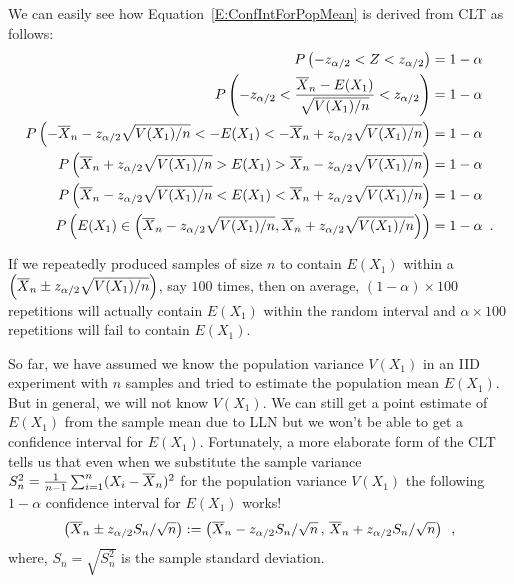 {\scriptsize
We can easily see how Equation~\eqref{E:ConfIntForPopMean} is derived from CLT as follows:
\begin{align*}
P \left( -z_{\alpha/2} < Z < z_{\alpha/2} \right) 
&= 1-\alpha \\
P \left( -z_{\alpha/2} < \frac{\overline{X}_n-E(X_1)}{\sqrt{V(X_1)/n}} < z_{\alpha/2} \right) 
&= 1-\alpha \\
P \left( -\overline{X}_n - z_{\alpha/2}\sqrt{V(X_1)/n}  < -E(X_1) < -\overline{X}_n + z_{\alpha/2} \sqrt{V(X_1)/n} \right) 
&= 1-\alpha \\
P \left( \overline{X}_n + z_{\alpha/2}\sqrt{V(X_1)/n}  > E(X_1) > \overline{X}_n - z_{\alpha/2} \sqrt{V(X_1)/n} \right) 
&= 1-\alpha \\
P \left( \overline{X}_n - z_{\alpha/2}\sqrt{V(X_1)/n}  < E(X_1) < \overline{X}_n + z_{\alpha/2} \sqrt{V(X_1)/n} \right) 
&= 1-\alpha \\
P \left( E(X_1) \in \left(\overline{X}_n - z_{\alpha/2}\sqrt{V(X_1)/n} , \overline{X}_n + z_{\alpha/2} \sqrt{V(X_1)/n} \right) \right) 
&= 1-\alpha \enspace .
\end{align*}
}

\begin{rem}  
If we repeatedly produced samples of size $n$ to contain $E(X_1)$ within a $\left( \overline{X}_n \pm z_{\alpha/2} \sqrt{V(X_1)/n} \right)$, say $100$ times, then on average, $(1-\alpha) \times 100$ repetitions will actually contain $E(X_1)$ within the random interval and $\alpha \times 100$ repetitions will fail to contain $E(X_1)$.
\end{rem}

So far, we have assumed we know the population variance $V(X_1)$ in an IID experiment with $n$ samples and tried to estimate the population mean $E(X_1)$.  
But in general, we will not know $V(X_1)$.  We can still get a point estimate of $E(X_1)$ from the sample mean due to LLN but we won't be able to get a confidence interval for $E(X_1)$.  
Fortunately, a more elaborate form of the CLT tells us that even when we substitute the sample variance $S_n^2 = \frac{1}{n-1}\sum_{i=1}^n (X_i-\overline{X}_n)^2$ for the population variance $V(X_1)$ the following $1-\alpha$ confidence interval for $E(X_1)$ works!
\begin{equation}\label{E:ConfIntForPopMeanUsingSampleVariance}
\left( \overline{X}_n \pm z_{\alpha/2} S_n/\sqrt{n} \right) :=
\left( \overline{X}_n - z_{\alpha/2} S_n/\sqrt{n} \, , \, \overline{X}_n + z_{\alpha/2} S_n/\sqrt{n} \right) \enspace ,
\end{equation}
where, $S_n=\sqrt{S_n^2}$ is the sample standard deviation.

